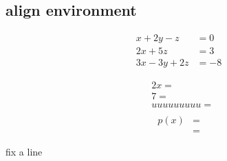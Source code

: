 \documentclass{article}
\begin{document}
\subsection{align environment}

\begin{align} %
	x + 2y -z &=0\\
	2x+5z &=3 \\
	3x-3y+2z &=-8
\end{align}

\begin{align*}
	&2x=\\
	&7=\\
	&uuuuuuuuu=\\
\end{align*}
\begin{align*}
	p(x)&=
	\\
	&=
\end{align*}


fix a line

	
	
\end{document}
